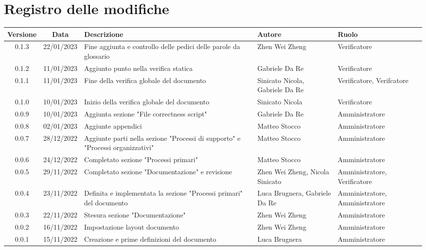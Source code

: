 \section*{Registro delle modifiche}
\begin{center}
\renewcommand\tabularxcolumn[1]{>{\Centering}m{#1}}
\begin{tabularx}{\textwidth}{| c | c | X | X | X |} 
\hline
 \textbf{Versione} & \textbf{Data} & \textbf{Descrizione} & \textbf{Autore} & \textbf{Ruolo}\\
 \hline
 0.1.3 & 22/01/2023 & Fine aggiunta e controllo delle pedici delle parole da glossario & Zhen Wei Zheng & Verificatore \\
 \hline
 0.1.2 & 11/01/2023 & Aggiunto punto nella verifica statica & Gabriele Da Re & Verificatore\\
 \hline
 0.1.1 & 11/01/2023 & Fine della verifica globale del documento & Sinicato Nicola, Gabriele Da Re & Verificatore, Verifcatore\\
 \hline
 0.1.0 & 10/01/2023 & Inizio della verifica globale del documento & Sinicato Nicola & Verificatore\\
 \hline
 0.0.9 & 10/01/2023 & Aggiunta sezione "File correctness script" & Gabriele Da Re & Amministratore\\
 \hline
 0.0.8 & 02/01/2023 & Aggiunte appendici & Matteo Stocco & Amministratore\\
 \hline
 0.0.7 & 28/12/2022 & Aggiunte parti nella sezione "Processi di supporto" e "Processi organizzativi" & Matteo Stocco & Amministratore\\
 \hline
 0.0.6 & 24/12/2022 & Completato sezione "Processi primari" & Matteo Stocco & Amministratore\\
 \hline
 0.0.5 & 29/11/2022 & Completato sezione "Documentazione" e revisione & Zhen Wei Zheng, Nicola Sinicato & Amministratore, Verificatore\\
 \hline
 0.0.4 & 23/11/2022 &  Definita e implementata la sezione "Processi primari" del documento & Luca Brugnera, Gabriele Da Re & Amministratore, Amministratore\\
 \hline
 0.0.3 & 22/11/2022 & Stesura sezione "Documentazione" & Zhen Wei Zheng & Amministratore\\
 \hline
 0.0.2 & 16/11/2022 & Impostazione layout documento & Zhen Wei Zheng & Amministratore\\
 \hline
 0.0.1 & 15/11/2022 & Creazione e prime definizioni del documento & Luca Brugnera & Amministratore\\
 \hline
\end{tabularx}
\end{center}
